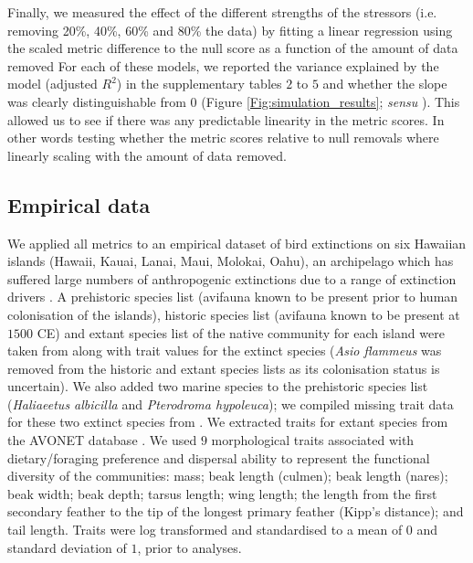 \documentclass[12pt,letterpaper]{article}
\begin{document}
Finally, we measured the effect of the different strengths of the stressors (i.e. removing 20\%, 40\%, 60\% and 80\% the data) by fitting a linear regression using the scaled metric difference to the null score as a function of the amount of data removed
For each of these models, we reported the variance explained by the model (adjusted $R^2$) in the supplementary tables $2$ to $5$ and whether the slope was clearly distinguishable from $0$ (Figure \ref{Fig:simulation_results}; \textit{sensu} \citealt{dushoff2019can}).
This allowed us to see if there was any predictable linearity in the metric scores.
In other words testing whether the metric scores relative to null removals where linearly scaling with the amount of data removed.


\subsection{Empirical data}


We applied all metrics to an empirical dataset of bird extinctions on six Hawaiian islands (Hawaii, Kauai, Lanai, Maui, Molokai, Oahu), an archipelago which has suffered large numbers of anthropogenic extinctions due to a range of extinction drivers \citep{Walther2022}.
A prehistoric species list (avifauna known to be present prior to human colonisation of the islands), historic species list (avifauna known to be present at $1500$ CE) and extant species list of the native community for each island were taken from \cite{matthews2023global} along with trait values for the extinct species (\textit{Asio flammeus} was removed from the historic and extant species lists as its colonisation status is uncertain).
We also added two marine species to the prehistoric species list (\textit{Haliaeetus albicilla} and \textit{Pterodroma hypoleuca}); we compiled missing trait data for these two extinct species from \cite{sayol2021loss}.
We extracted traits for extant species from the AVONET database \citep{tobias2022avonet}.
We used $9$ morphological traits associated with dietary/foraging preference and dispersal ability \citep{pigot2020macroevolutionary,sheard2020ecological} to represent the functional diversity of the communities: mass; beak length (culmen); beak length (nares); beak width; beak depth; tarsus length; wing length; the length from the first secondary feather to the tip of the longest primary feather (Kipp's distance); and tail length.
Traits were log transformed and standardised to a mean of $0$ and standard deviation of $1$, prior to analyses.
\end{document}
